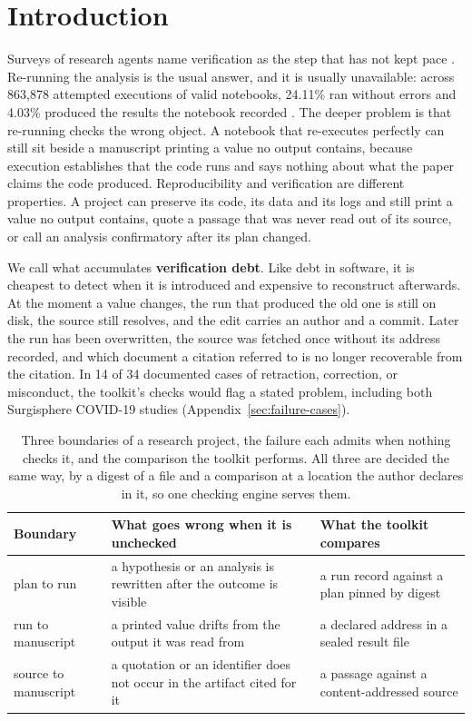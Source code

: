 \documentclass{article}
\begin{document}
\section{Introduction}
\label{sec:intro}

Surveys of research agents name verification as the step that has not kept pace
\citep{ding2026verificationgap}. Re-running the analysis is the usual answer, and it is
usually unavailable: across 863{,}878
attempted executions of valid notebooks, 24.11\% ran without errors and 4.03\% produced the
results the notebook recorded \citep{pimentel2019notebooks}. The deeper problem is that
re-running checks the wrong object. A notebook that re-executes perfectly can still sit beside a
manuscript printing a value no output contains, because execution establishes that the code runs
and says nothing about what the paper claims the code produced. Reproducibility and verification
are different properties. A project can preserve its code, its data and its logs and still
print a value no output contains, quote a passage that was never read out of its source, or call an analysis
confirmatory after its plan changed.

We call what accumulates \textbf{verification debt}. Like debt in software, it is cheapest to
detect when it is introduced and expensive to reconstruct afterwards. At the moment a value
changes, the run that produced the old one is still on disk, the source still resolves, and the
edit carries an author and a commit. Later the run has been overwritten, the source was fetched
once without its address recorded, and which document a citation referred to is no longer
recoverable from the citation. In 14 of 34 documented cases of retraction, correction, or
misconduct, the toolkit's checks would flag a stated problem, including both Surgisphere
COVID-19 studies (Appendix~\ref{sec:failure-cases}).

\begin{table}[h]
\centering
\small
\caption{Three boundaries of a research project, the failure each admits when nothing checks it,
and the comparison the toolkit performs. All three are decided the same way, by a digest of a file
and a comparison at a location the author declares in it, so one checking engine serves them.}
\label{tab:boundaries}
\begin{tabular}{@{}>{\raggedright\arraybackslash}p{}>{\raggedright\arraybackslash}p{}>{\raggedright\arraybackslash}p{}@{}}
\toprule
\textbf{Boundary} & \textbf{What goes wrong when it is unchecked} & \textbf{What the toolkit compares} \\
\midrule
plan to run & a hypothesis or an analysis is rewritten after the outcome is visible & a run record against a plan pinned by digest \\
run to manuscript & a printed value drifts from the output it was read from & a declared address in a sealed result file \\
source to manuscript & a quotation or an identifier does not occur in the artifact cited for it & a passage against a content-addressed source \\
\bottomrule
\end{tabular}
\end{table}
\end{document}

